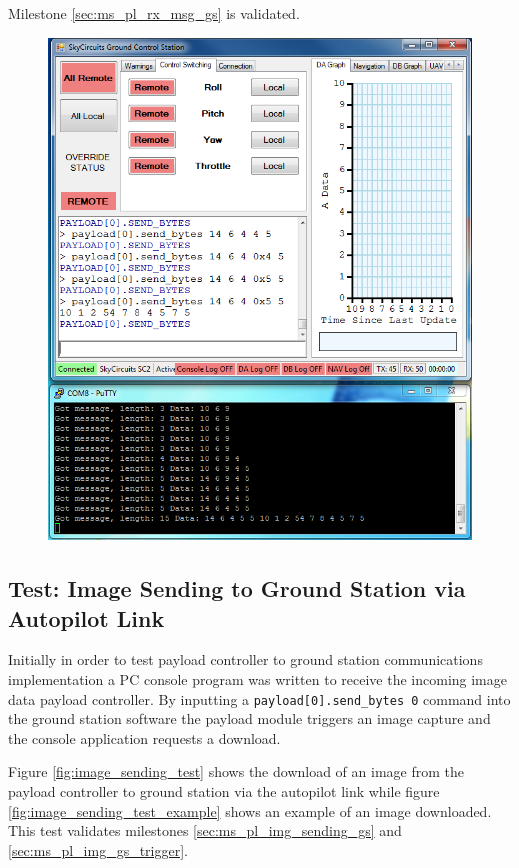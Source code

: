 Milestone \ref{sec:ms_pl_rx_msg_gs} is validated.

\begin{figure}[H]
        \centering
        \includegraphics[width=1.0\textwidth]{testing_screenshots/send_bytes_test.png}
        \label{fig:send_bytes_test}
\end{figure}


\subsection{Test: Image Sending to Ground Station via Autopilot Link}
\label{sec:test_pl_image_send}
Initially in order to test payload controller to ground station communications implementation
a PC console program was written to receive the incoming image data payload controller. By
inputting a \verb+payload[0].send_bytes 0+ command into the ground station software
the payload module triggers an image capture and the console application requests a download.

Figure \ref{fig:image_sending_test} shows the download of an image from the payload controller to
ground station via the autopilot link while figure \ref{fig:image_sending_test_example} shows an example
of an image downloaded. This test validates milestones \ref{sec:ms_pl_img_sending_gs} and \ref{sec:ms_pl_img_gs_trigger}.

